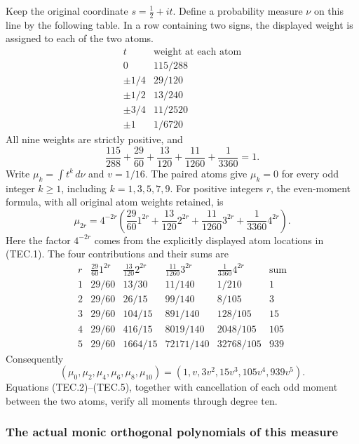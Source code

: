 Keep the original coordinate \(s=\tfrac12+it\).  Define a probability
measure \(\nu\) on this line by the following table.  In a row containing
two signs, the displayed weight is assigned to each of the two atoms.
\[
\begin{array}{c|c}
t&\text{weight at each atom}\\\hline
0&115/288\\
\pm1/4&29/120\\
\pm1/2&13/240\\
\pm3/4&11/2520\\
\pm1&1/6720
\end{array}                                                    \tag{TEC.1}
\]
All nine weights are strictly positive, and
\[
 \frac{115}{288}+\frac{29}{60}+\frac{13}{120}
       +\frac{11}{1260}+\frac1{3360}=1.                          \tag{TEC.2}
\]
Write \(\mu_k=\int t^k\,d\nu\) and \(v=1/16\).
The paired atoms give \(\mu_k=0\) for every odd integer \(k\geq1\),
including \(k=1,3,5,7,9\).  For positive integers \(r\), the
even-moment formula, with all original atom weights retained, is
\[
 \mu_{2r}=4^{-2r}
 \left(\frac{29}{60}1^{2r}+\frac{13}{120}2^{2r}
             +\frac{11}{1260}3^{2r}+\frac1{3360}4^{2r}\right).
                                                                    \tag{TEC.3}
\]
Here the factor \(4^{-2r}\) comes from the explicitly displayed atom
locations in (TEC.1).  The four contributions and their sums are
\[
\begin{array}{c|rrrr|r}
r&\frac{29}{60}1^{2r}&\frac{13}{120}2^{2r}
 &\frac{11}{1260}3^{2r}&\frac1{3360}4^{2r}&\text{sum}\\\hline
1&29/60&13/30&11/140&1/210&1\\
2&29/60&26/15&99/140&8/105&3\\
3&29/60&104/15&891/140&128/105&15\\
4&29/60&416/15&8019/140&2048/105&105\\
5&29/60&1664/15&72171/140&32768/105&939
\end{array}                                                       \tag{TEC.4}
\]
Consequently
\[
 (\mu_0,\mu_2,\mu_4,\mu_6,\mu_8,\mu_{10})
       =(1,v,3v^2,15v^3,105v^4,939v^5).                           \tag{TEC.5}
\]
Equations (TEC.2)--(TEC.5), together with cancellation of each odd
moment between the two atoms, verify all moments through degree ten.

\subsubsection{The actual monic orthogonal polynomials of this measure}

